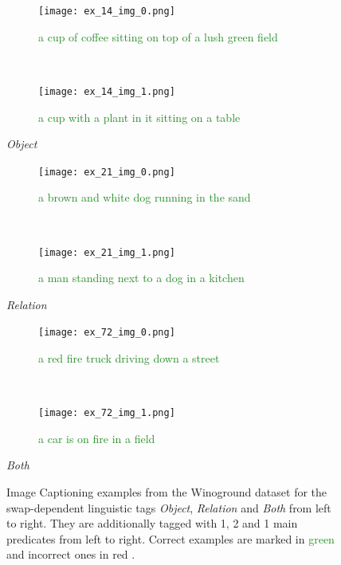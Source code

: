 \begin{figure}[ht]
\centering
    \begin{minipage}[t]{.30\textwidth}
        \begin{subfigure}[t]{\textwidth}
        \centering
        \texttt{[image: ex\_14\_img\_0.png]}
        \caption{\textcolor{ForestGreen}{a cup of coffee sitting on top of a lush green field \cmark}}
        \end{subfigure}\\
        \begin{subfigure}[t]{\textwidth}
        \centering
        \texttt{[image: ex\_14\_img\_1.png]}
        \caption{\textcolor{ForestGreen}{a cup with a plant in it sitting on a table \cmark}}
        \end{subfigure}%
        \caption*{\textit{Object}}
    \end{minipage}
    \hfill
    \begin{minipage}[t]{.30\textwidth}
        \begin{subfigure}[t]{\textwidth}
        \centering
        \texttt{[image: ex\_21\_img\_0.png]}
        \caption{\textcolor{ForestGreen}{a brown and white dog running in the sand \cmark}}
        \end{subfigure}\\
        \begin{subfigure}[t]{\textwidth}
        \centering
        \texttt{[image: ex\_21\_img\_1.png]}
        \caption{\textcolor{ForestGreen}{a man standing next to a dog in a kitchen \cmark}}
        \end{subfigure}%
        \caption*{\textit{Relation}}
    \end{minipage}
    \hfill
    \begin{minipage}[t]{.30\textwidth}
        \begin{subfigure}[t]{\textwidth}
        \centering
        \texttt{[image: ex\_72\_img\_0.png]}
        \caption{\textcolor{ForestGreen}{a red fire truck driving down a street \cmark}}
        \end{subfigure}\\
        \begin{subfigure}[t]{\textwidth}
        \centering
        \texttt{[image: ex\_72\_img\_1.png]}
        \caption{\textcolor{ForestGreen}{a car is on fire in a field \cmark}}
        \end{subfigure}%
        \vspace{10pt}
        \caption*{\textit{Both}}
    \end{minipage}%
    \caption{Image Captioning examples from the Winoground dataset for the swap-dependent linguistic tags \textit{Object}, \textit{Relation} and \textit{Both} from left to right. They are additionally tagged with 1, 2 and 1 main predicates from left to right.  Correct examples are marked in \textcolor{ForestGreen}{green \cmark} and incorrect ones in \textcolor{BrickRed}{red \xmark}.}
    \label{fig:captioning-examples-linguistic}
\end{figure}

